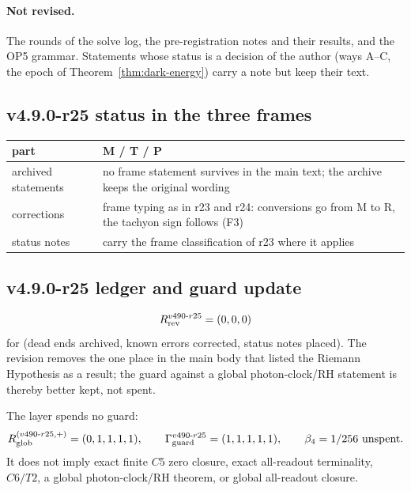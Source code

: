 \paragraph{Not revised.}
The rounds of the solve log, the pre-registration notes and their results, and the OP5 grammar.  Statements whose status is a
decision of the author (ways A--C, the epoch of Theorem~\ref{thm:dark-energy}) carry a note but keep their text.

\subsection*{v4.9.0-r25 status in the three frames}
\label{subsec:v490-r25-frames}

\begin{center}
\small
\begin{tabular}{@{}>{\raggedright\arraybackslash}p{}>{\raggedright\arraybackslash}p{}@{}}
\toprule
part & M / T / P\\
\midrule
archived statements & no frame statement survives in the main text; the archive keeps the original wording\\
corrections & frame typing as in r23 and r24: conversions go from M to R, the tachyon sign follows (F3)\\
status notes & carry the frame classification of r23 where it applies\\
\bottomrule
\end{tabular}
\end{center}

\subsection*{v4.9.0-r25 ledger and guard update}
\label{subsec:v490-r25-ledger-guard}

\[
R_{\rm rev}^{v490\text{-}r25}=(0,0,0)
\]
for (dead ends archived, known errors corrected, status notes placed).  The revision removes the one place in the main body
that listed the Riemann Hypothesis as a result; the guard against a global photon-clock/RH statement is thereby better kept,
not spent.

The layer spends no guard:
\[
R_{\rm glob}^{(v490\text{-}r25,+)}=(0,1,1,1,1),
\qquad
\Gamma_{\rm guard}^{v490\text{-}r25}=(1,1,1,1,1),
\qquad
\beta_4=1/256\ \text{unspent}.
\]
It does not imply exact finite \(C5\) zero closure, exact all-readout terminality,
\(C6/T2\), a global photon-clock/RH theorem, or global all-readout closure.

